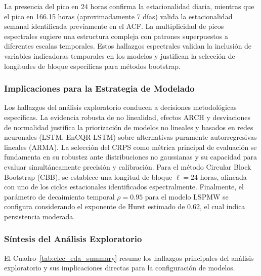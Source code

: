La presencia del pico en 24 horas confirma la estacionalidad diaria, mientras que el pico en 166.15 horas (aproximadamente 7 días) valida la estacionalidad semanal identificada previamente en el ACF. La multiplicidad de picos espectrales sugiere una estructura compleja con patrones superpuestos a diferentes escalas temporales. Estos hallazgos espectrales validan la inclusión de variables indicadoras temporales en los modelos y justifican la selección de longitudes de bloque específicas para métodos bootstrap.

\subsubsection{Implicaciones para la Estrategia de Modelado}

Los hallazgos del análisis exploratorio conducen a decisiones metodológicas específicas. La evidencia robusta de no linealidad, efectos ARCH y desviaciones de normalidad justifica la priorización de modelos no lineales y basados en redes neuronales (LSTM, EnCQR-LSTM) sobre alternativas puramente autorregresivas lineales (ARMA). La selección del CRPS como métrica principal de evaluación se fundamenta en su robustez ante distribuciones no gaussianas y su capacidad para evaluar simultáneamente precisión y calibración. Para el método Circular Block Bootstrap (CBB), se establece una longitud de bloque $\ell = 24$ horas, alineada con uno de los ciclos estacionales identificados espectralmente. Finalmente, el parámetro de decaimiento temporal $\rho = 0.95$ para el modelo LSPMW se configura considerando el exponente de Hurst estimado de 0.62, el cual indica persistencia moderada.

\subsubsection{Síntesis del Análisis Exploratorio}

El Cuadro~\ref{tab:elec_eda_summary} resume los hallazgos principales del análisis exploratorio y sus implicaciones directas para la configuración de modelos.

